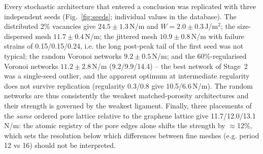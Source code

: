 Every stochastic architecture that entered a conclusion was replicated with three independent seeds (Fig.~\ref{fig:seeds}; individual values in the database). The distributed 2\% vacancies give $24.5\pm1.3$\,N/m and $W=2.0\pm0.3$\,J/m$^2$; the size-dispersed mesh $11.7\pm0.4$\,N/m; the jittered mesh $10.9\pm0.8$\,N/m with failure strains of 0.15/0.15/0.24, i.e. the long post-peak tail of the first seed was not typical; the random Voronoi networks $9.2\pm0.5$\,N/m; and the 60\%-regularised Voronoi networks $11.2\pm2.8$\,N/m (9.2/9.9/14.4) -- the best network of Stage~2 was a single-seed outlier, and the apparent optimum at intermediate regularity does not survive replication (regularity 0.3/0.8 give 10.5/6.6\,N/m). The random networks are thus consistently the weakest matched-porosity architectures and their strength is governed by the weakest ligament. Finally, three placements of the \emph{same} ordered pore lattice relative to the graphene lattice give 11.7/12.0/13.1\,N/m: the atomic registry of the pore edges alone shifts the strength by $\approx$12\%, which sets the resolution below which differences between fine meshes (e.g. period 12 vs 16) should not be interpreted.
